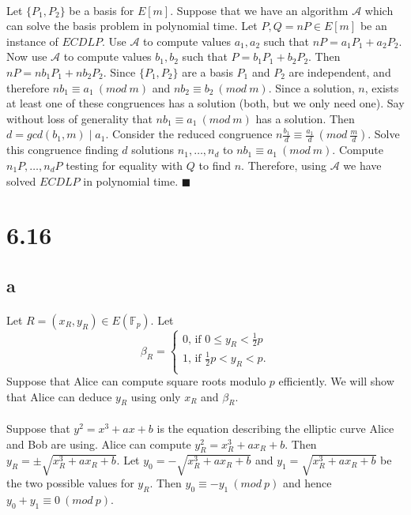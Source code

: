 \documentclass[letterpaper,12pt,oneside,onecolumn]{report}
\begin{document}
\paragraph{}
Let $\{P_1, P_2 \}$ be a basis for $E[m]$. Suppose that we have an algorithm $\mathcal{A}$ which can solve the basis problem in polynomial time. Let $P, Q=nP \in E[m]$ be an instance of $ECDLP$. Use $\mathcal{A}$ to compute values $a_1, a_2$ such that $nP = a_1P_1 + a_2P_2$. Now use $\mathcal{A}$ to compute values $b_1, b_2$ such that $P = b_1P_1 + b_2P_2$. Then $nP = nb_1P_1 + nb_2P_2$. Since $\{ P_1, P_2 \}$ are a basis $P_1$ and $P_2$ are independent, and therefore $nb_1 \equiv a_1\ (mod\ m)$ and $nb_2 \equiv b_2\ (mod\ m)$. Since a solution, $n$, exists at least one of these congruences has a solution (both, but we only need one). Say without loss of generality that $nb_1 \equiv a_1\ (mod\ m)$ has a solution. Then $d = gcd(b_1, m) \mid a_1$. Consider the reduced congruence $n\frac{b_1}{d} \equiv \frac{a_1}{d}\ (mod\ \frac{m}{d})$. Solve this congruence finding $d$ solutions $n_1, \dots, n_d$ to $nb_1 \equiv a_1\ (mod\ m)$. Compute $n_1P, \dots, n_dP$ testing for equality with $Q$ to find $n$. Therefore, using $\mathcal{A}$ we have solved $ECDLP$ in polynomial time. $\blacksquare$
\section*{6.16}
\subsection*{a}
\paragraph{}
Let $R = (x_R, y_R) \in E(\mathbb{F}_p)$. Let
\begin{equation*}
\beta_R = \begin{cases}
0 \text{, if $0 \leq y_R < \frac{1}{2}p$}\\
1 \text{, if $\frac{1}{2}p < y_R < p$.}\\
\end{cases}
\end{equation*}
Suppose that Alice can compute square roots modulo $p$ efficiently. We will show that Alice can deduce $y_R$ using only $x_R$ and $\beta_R$. 
\paragraph{}
Suppose that $y^2 = x^3 + ax + b$ is the equation describing the elliptic curve Alice and Bob are using. Alice can compute $y_R^2 = x_R^3 + ax_R + b$. Then $y_R = \pm \sqrt{x_R^3 + ax_R + b}$. Let $y_0 = -\sqrt{x_R^3 + ax_R + b}$ and $y_1 = \sqrt{x_R^3 + ax_R + b}$ be the two possible values for $y_R$. Then $y_0 \equiv -y_1\ (mod\ p)$ and hence $y_0 + y_1 \equiv 0\ (mod\ p)$.
\end{document}

